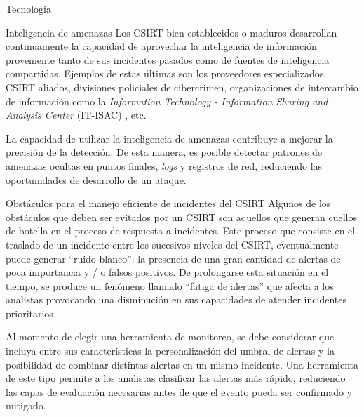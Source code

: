 \begin{section}{Tecnología}
        \begin{subsection}{Inteligencia de amenazas}
        Los CSIRT bien establecidos o maduros desarrollan continuamente la capacidad de aprovechar la inteligencia de información proveniente tanto de sus incidentes pasados como de fuentes de inteligencia compartidas. Ejemplos de estas últimas son los proveedores especializados, CSIRT aliados, divisiones policiales de cibercrimen, organizaciones de intercambio de información como la \textit{Information Technology - Information Sharing and Analysis Center} (IT-ISAC) \cite{it_isac}, etc. \par
        La capacidad de utilizar la inteligencia de amenazas contribuye a mejorar la precisión de la detección. De esta manera, es posible detectar patrones de amenazas ocultas en puntos finales, \textit{logs} y registros de red, reduciendo las oportunidades de desarrollo de un ataque.
        \end{subsection}
        \pagebreak
        \begin{subsection}{Obstáculos para el manejo eficiente de incidentes del CSIRT}
        Algunos de los obstáculos que deben ser evitados por un CSIRT son aquellos que generan cuellos de botella en el proceso de respuesta a incidentes.  Este proceso que consiste en el traslado de un incidente entre los sucesivos niveles del CSIRT, eventualmente puede generar “ruido blanco”: la presencia de una gran cantidad de alertas de poca importancia y / o falsos positivos. De prolongarse esta situación en el tiempo, se produce un fenómeno llamado “fatiga de alertas” que afecta a los analistas provocando una disminución en sus capacidades de atender incidentes prioritarios. \par
        Al momento de elegir una herramienta de monitoreo, se debe considerar que incluya entre sus características la personalización del umbral de alertas y la posibilidad de combinar distintas alertas en un mismo incidente. Una herramienta de este tipo permite a los analistas clasificar las alertas más rápido, reduciendo las capas de evaluación necesarias antes de que el evento pueda ser confirmado y mitigado. 
        \end{subsection}
   \end{section}
      
